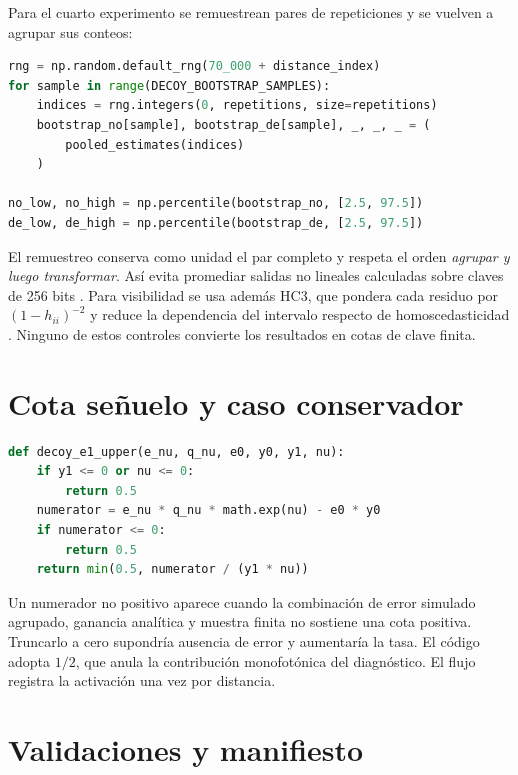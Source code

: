 Para el cuarto experimento se remuestrean pares de repeticiones y se vuelven a agrupar sus conteos:

\begin{lstlisting}[language=Python, caption={Bootstrap pareado con agrupamiento previo a la fórmula no lineal.}]
rng = np.random.default_rng(70_000 + distance_index)
for sample in range(DECOY_BOOTSTRAP_SAMPLES):
    indices = rng.integers(0, repetitions, size=repetitions)
    bootstrap_no[sample], bootstrap_de[sample], _, _, _ = (
        pooled_estimates(indices)
    )

no_low, no_high = np.percentile(bootstrap_no, [2.5, 97.5])
de_low, de_high = np.percentile(bootstrap_de, [2.5, 97.5])
\end{lstlisting}

El remuestreo conserva como unidad el par completo y respeta el orden \emph{agrupar y luego transformar}. Así evita promediar salidas no lineales calculadas sobre claves de 256 bits \cite{efron1979bootstrap}. Para visibilidad se usa además HC3, que pondera cada residuo por \((1-h_{ii})^{-2}\) y reduce la dependencia del intervalo respecto de homoscedasticidad \cite{mackinnonWhite1985}. Ninguno de estos controles convierte los resultados en cotas de clave finita.

\section{Cota señuelo y caso conservador}

\begin{lstlisting}[language=Python, caption={Cota de error monofotónico con reemplazo conservador.}]
def decoy_e1_upper(e_nu, q_nu, e0, y0, y1, nu):
    if y1 <= 0 or nu <= 0:
        return 0.5
    numerator = e_nu * q_nu * math.exp(nu) - e0 * y0
    if numerator <= 0:
        return 0.5
    return min(0.5, numerator / (y1 * nu))
\end{lstlisting}

Un numerador no positivo aparece cuando la combinación de error simulado agrupado, ganancia analítica y muestra finita no sostiene una cota positiva. Truncarlo a cero supondría ausencia de error y aumentaría la tasa. El código adopta \(1/2\), que anula la contribución monofotónica del diagnóstico. El flujo registra la activación una vez por distancia.

\section{Validaciones y manifiesto}

